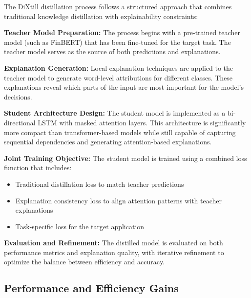 The DiXtill distillation process follows a structured approach that combines traditional knowledge distillation with explainability constraints:

\textbf{Teacher Model Preparation:} The process begins with a pre-trained teacher model (such as FinBERT) that has been fine-tuned for the target task. The teacher model serves as the source of both predictions and explanations.


\textbf{Explanation Generation:} Local explanation techniques are applied to the teacher model to generate word-level attributions for different classes. These explanations reveal which parts of the input are most important for the model's decisions.

\textbf{Student Architecture Design:} The student model is implemented as a bi-directional LSTM with masked attention layers. This architecture is significantly more compact than transformer-based models while still capable of capturing sequential dependencies and generating attention-based explanations.

\textbf{Joint Training Objective:} The student model is trained using a combined loss function that includes:
\begin{itemize}
    \item Traditional distillation loss to match teacher predictions
    \item Explanation consistency loss to align attention patterns with teacher explanations
    \item Task-specific loss for the target application
\end{itemize}


\textbf{Evaluation and Refinement:} The distilled model is evaluated on both performance metrics and explanation quality, with iterative refinement to optimize the balance between efficiency and accuracy.

\subsection{Performance and Efficiency Gains}

